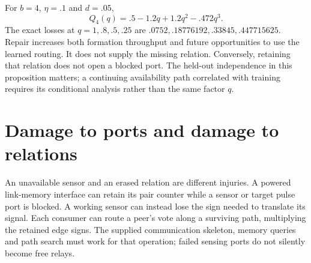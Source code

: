 \documentclass[11pt]{article}
\theoremstyle{definition}
\theoremstyle{remark}
\begin{document}
For $b=4$, $\eta=.1$ and $d=.05$,
\[
 Q_4(q)=.5-1.2q+1.2q^2-.472q^3.
\]
The exact losses at $q=1,.8,.5,.25$ are $.0752,.18776192,.33845,.447715625$. Repair increases both formation throughput and future opportunities to use the learned routing. It does not supply the missing relation. Conversely, retaining that relation does not open a blocked port. The held-out independence in this proposition matters; a continuing availability path correlated with training requires its conditional analysis rather than the same factor $q$.

\section{Damage to ports and damage to relations}
\label{sec:reroute}

An unavailable sensor and an erased relation are different injuries.
A powered link-memory interface can retain its pair counter while a
sensor or target pulse port is blocked. A working sensor can instead
lose the sign needed to translate its signal. Each consumer can route
a peer's vote along a surviving path, multiplying the retained edge
signs. The supplied communication skeleton, memory queries and path
search must work for that operation; failed sensing ports do not
silently become free relays.
\end{document}
